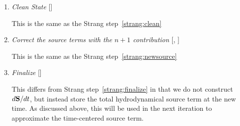 \begin{enumerate}
  This is the same as the Strang step~\ref{strang:radial}


\item {\em Clean State} []

  This is the same as the Strang step~\ref{strang:clean}

\item \label{strang:newsource} {\em Correct the source terms with the $n+1$ contribution}
  [, ]

  This is the same as the Strang step~\ref{strang:newsource}

\item {\em Finalize} []

  This differs from Strang step~\ref{strang:finalize} in that we do not
  construct $d{\bf S}/dt$, but instead store the total hydrodynamical source
  term at the new time.  As discussed above, this will be used in the 
  next iteration to approximate the time-centered source term.

\end{enumerate}




